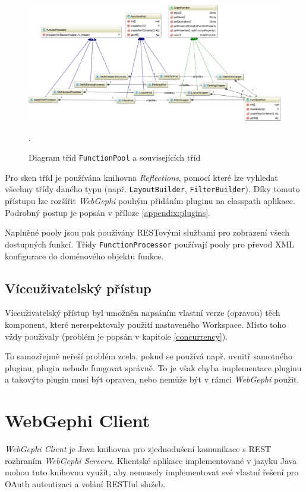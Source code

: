 \documentclass[thesis=M,czech]{FITthesis}[2014/05/6]
\begin{document}
\begin{figure}\centering
 	\includegraphics[width=1\textwidth]{images/class-diagram/server-pools}
 	\caption[Diagram tříd \texttt{FunctionPool} a souvisejících tříd]{Diagram tříd \texttt{FunctionPool} a souvisejících tříd}.\label{fig:server-pools}
\end{figure}

Pro sken tříd je používána knihovna \textit{Reflections}\cite{reflections}, pomocí které lze vyhledat všechny třídy daného typu (např. \texttt{LayoutBuilder}, \texttt{FilterBuilder}).
Díky tomuto přístupu lze rozšířit \textit{WebGephi} pouhým přidáním pluginu na classpath aplikace. Podrobný postup je popsán v příloze \ref{appendix:plugins}.

Naplněné pooly jsou pak používány RESTovými službami pro zobrazení všech dostupných funkcí. Třídy \texttt{FunctionProcessor} používají pooly pro převod XML konfigurace do 
doménového objektu funkce.

\subsection{Víceuživatelský přístup}
Víceuživatelský přístup byl umožněn napsáním vlastní verze (opravou) těch komponent, které nerespektovaly použití nastaveného Workspace. Místo toho vždy 
používaly  (problém je popsán v kapitole \ref{concurrency}).

To samozřejmě neřeší problém zcela, pokud se  používá např. uvnitř samotného pluginu, plugin nebude fungovat správně. To je však chyba 
implementace pluginu a takovýto plugin musí být opraven, nebo nemůže být v rámci \textit{WebGephi} použit.

\section{WebGephi Client}
\textit{WebGephi Client} je Java knihovna pro zjednodušení komunikace s REST rozhraním \textit{WebGephi Serveru}. Klientské aplikace 
implementované v jazyku Java mohou tuto knihovnu využít, aby nemusely implementovat své vlastní řešení pro OAuth autentizaci a volání RESTful služeb.
\end{document}
